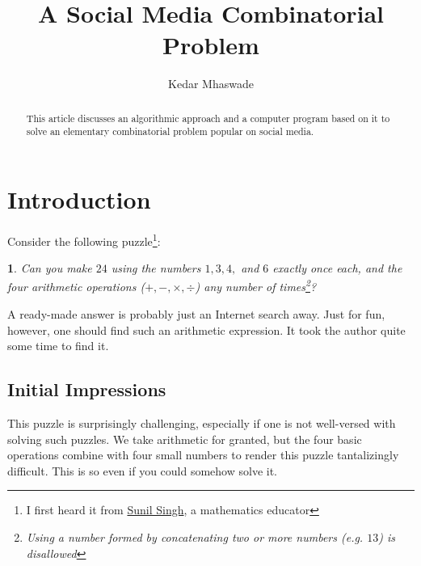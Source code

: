 \documentclass[english,smartquotes]{hgbarticle}
\newtheorem{question}{}
\begin{document}

\author{
	Kedar Mhaswade\\ 
}
\title{A Social Media Combinatorial Problem}
\date{}

\maketitle

\begin{abstract}\noindent
This article discusses an algorithmic approach and a computer program based on it
to solve an elementary combinatorial problem popular on social media.
\end{abstract}


\section{Introduction}

Consider the following puzzle\footnote{I first heard it from \href{https://sunilsingh-42118.medium.com/}{Sunil Singh}, a mathematics educator}:

\begin{question}
Can you make $24$ using the numbers $1, 3, 4,$ and $6$ exactly once each, and the four arithmetic operations ($+, -, \times, \div$) any number of times\footnote{Using a number formed by concatenating two or more numbers (e.g. $13$) is disallowed}?
\end{question}

A ready-made answer is probably just an Internet search away. Just for fun, however, one should find such an arithmetic expression. It took the author quite some time to find it.

\subsection{Initial Impressions}
This puzzle is surprisingly challenging, especially if one is not well-versed with solving such puzzles. We take arithmetic for granted, but the four basic operations combine with four small numbers to render this puzzle tantalizingly difficult. This is so even if you could somehow solve it.
\end{document}
